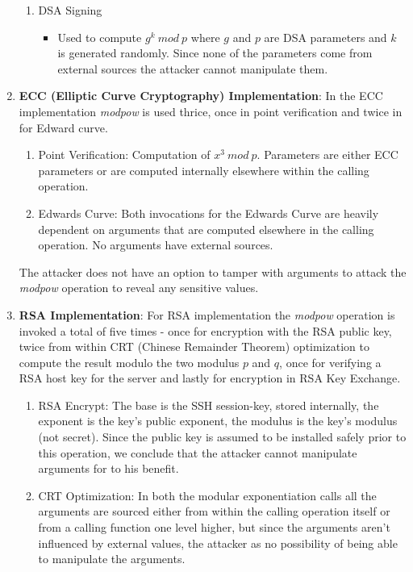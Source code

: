 \documentclass{report}
\begin{document}
\begin{enumerate}
\begin{enumerate}
        \item{DSA Signing}
        \begin{itemize}
        \item
        Used to compute \(g^k \ mod \ p\) where \(g\) and \(p\) are DSA parameters and \(k\) is generated randomly. Since none of the parameters come from external sources the attacker cannot manipulate them.
        \end{itemize}
        \end{enumerate}
    \item \textbf{ECC (Elliptic Curve Cryptography) Implementation}:
        In the ECC implementation \textit{modpow} is used thrice, once in point verification and twice in for Edward curve.
        \begin{enumerate}
            \item {Point Verification}:
            Computation of \(x^3\ mod\ p\). Parameters are either ECC parameters or are computed internally elsewhere within the calling operation.
            \item{Edwards Curve}:
            Both invocations for the Edwards Curve are heavily dependent on arguments that are computed elsewhere in the calling operation. No arguments have external sources.
        \end{enumerate}
        The attacker does not have an option to tamper with arguments to attack the \textit{modpow} operation to reveal any sensitive values.
    \item \textbf{RSA Implementation}: For RSA implementation the \textit{modpow} operation is invoked a total of five times - once for encryption with the RSA public key, twice from within CRT (Chinese Remainder Theorem) optimization to compute the result modulo the two modulus \(p\) and \(q\), once for verifying a RSA host key for the server and lastly for encryption in RSA Key Exchange.
        \begin{enumerate}
            \item{RSA Encrypt}: The base is the SSH session-key, stored internally, the exponent is the key's public exponent, the modulus is the key's modulus (not secret). Since the public key is assumed to be installed safely prior to this operation, we conclude that the attacker cannot manipulate arguments for to his benefit.
            \item{CRT Optimization}: In both the modular exponentiation calls all the arguments are sourced either from within the calling operation itself or from a calling function one level higher, but since the arguments aren't influenced by external values, the attacker as no possibility of being able to manipulate the arguments.

\end{enumerate}
\end{enumerate}
\end{document}
